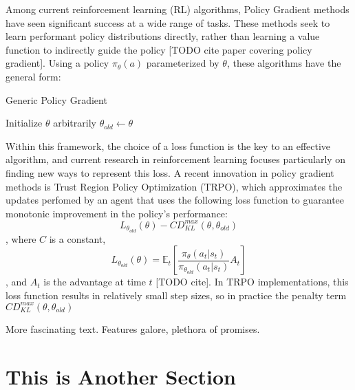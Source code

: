 \documentclass[letterpaper,twocolumn,10pt]{article}
\begin{document}
Among current reinforcement learning (RL) algorithms, Policy Gradient methods
have seen significant success at a wide range of tasks. These methods seek to
learn performant policy distributions directly, rather than learning a value
function to indirectly guide the policy [TODO cite paper covering policy
gradient]. Using a policy $\pi_{\theta}(a)$ parameterized by $\theta$, these
algorithms have the general form: 
\begin{algorithm}[H]
    \caption{Generic Policy Gradient}
    \begin{algorithmic}
        \State Initialize $\theta$ arbitrarily
            \State $\theta_{old} \gets \theta$
        \EndWhile
    \end{algorithmic}
\end{algorithm}
Within this framework, the choice of a loss function is the key to an effective
algorithm, and current research in reinforcement learning focuses particularly
on finding new ways to represent this loss. A recent innovation in policy
gradient methods is Trust Region Policy Optimization (TRPO), which approximates
the updates perfomed by an agent that uses the following loss function to 
guarantee monotonic improvement in the policy's performance:
    $$L_{\theta_{old}}(\theta) 
    - CD_{KL}^{max}(\theta, \theta_{old})
    $$
, where $C$ is a constant,
$$L_{\theta_{old}}(\theta) =
            \mathbb{E}_t \left[ 
            \frac
            {\pi_{\theta}(a_t | s_t)}
            {\pi_{\theta_{old}} (a_t | s_t)}
            A_t
            \right]$$, and $A_t$ is the advantage at time $t$ [TODO cite].
In TRPO implementations, this loss function results in relatively
small step sizes, so in practice the penalty term $CD_{KL}^{max}(\theta,
\theta_{old})$

More fascinating text. Features galore, plethora of promises.\\

\section{This is Another Section}
\end{document}
